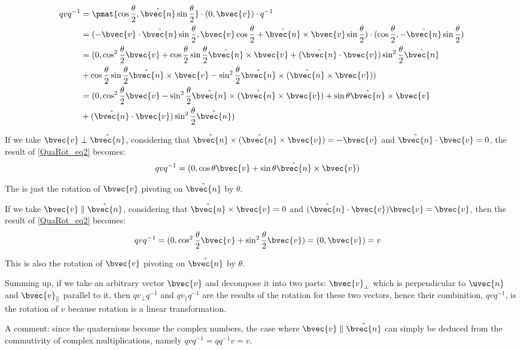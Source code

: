 \begin{equation}\label{QuaRot_eq2}
\begin{aligned}
qvq^{-1}&=\pmat{\cos{\frac{\theta}{2}}, \hat{\bvec{n}}\sin{\frac{\theta}{2}}}\cdot (0, \bvec{v})\cdot q^{-1}\\&
=(-\bvec{v}\cdot\hat{\bvec{n}}\sin{\frac{\theta}{2}}, \bvec{v}\cos{\frac{\theta}{2}}+\hat{\bvec{n}}\times\bvec{v}\sin{\frac{\theta}{2}})\cdot (\cos{\frac{\theta}{2}}, -\hat{\bvec{n}}\sin{\frac{\theta}{2}})\\&
=(0, \cos^2\frac{\theta}{2}\bvec{v}+\cos\frac{\theta}{2}\sin\frac{\theta}{2}\hat{\bvec{n}}\times\bvec{v}+(\hat{\bvec{n}}\cdot\bvec{v})\sin^2\frac{\theta}{2}\hat{\bvec{n}}\\&+\cos\frac{\theta}{2}\sin\frac{\theta}{2}\hat{\bvec{n}}\times\bvec{v}-\sin^2\frac{\theta}{2}\hat{\bvec{n}}\times(\hat{\bvec{n}}\times\bvec{v}))\\&
=(0, \cos^2\frac{\theta}{2}\bvec{v}-\sin^2\frac{\theta}{2}\hat{\bvec{n}}\times(\hat{\bvec{n}}\times\bvec{v})+\sin\theta\hat{\bvec{n}}\times\bvec{v}\\&+(\hat{\bvec{n}}\cdot\bvec{v})\sin^2\frac{\theta}{2}\hat{\bvec{n}})
\end{aligned}
\end{equation}

If we take $\bvec{v}\perp\hat{\bvec{n}}$, considering that $\hat{\bvec{n}}\times(\hat{\bvec{n}}\times\bvec{v})=-\bvec{v}$ and $\hat{\bvec{n}}\cdot\bvec{v}=0$, the result of \autoref{QuaRot_eq2} becomes: 
\begin{equation}
\begin{aligned}
qvq^{-1}&=(0, \cos\theta\bvec{v}+\sin\theta\hat{\bvec{n}}\times\bvec{v})
\end{aligned}
\end{equation}

The is just the rotation of $\bvec{v}$ pivoting on $\hat{\bvec{n}}$ by $\theta$. 

If we take $\bvec{v}\parallel\hat{\bvec{n}}$, considering that $\hat{\bvec{n}}\times\bvec{v}=0$ and $(\hat{\bvec{n}}\cdot\bvec{v})\bvec{v}=\bvec{v}$, then the result of \autoref{QuaRot_eq2} becomes: 
\begin{equation}
\begin{aligned}
qvq^{-1}&=(0, \cos^2\frac{\theta}{2}\bvec{v}+\sin^2\frac{\theta}{2}\bvec{v})=(0, \bvec{v})=v
\end{aligned}
\end{equation}

This is also the rotation of $\bvec{v}$ pivoting on $\hat{\bvec{n}}$ by $\theta$. 

Summing up, if we take an arbitrary vector $\bvec{v}$ and decompose it into two parts: $\bvec{v}_\perp$ which is perpendicular to $\uvec{n}$ and $\bvec{v}_\parallel$ parallel to it, then $q v_\perp q^{-1}$ and $q v_\parallel q^{-1}$ are the results of the rotation for these two vectors, hence their combinition, $qvq^{-1}$, is the rotation of $v$ because rotation is a linear transformation. 

A comment: since the quaternions become the complex numbers, the case where $\bvec{v}\parallel\hat{\bvec{n}}$ can simply be deduced from the commutivity of complex multiplications, namely $qvq^{-1}=qq^{-1}v=v$. 

